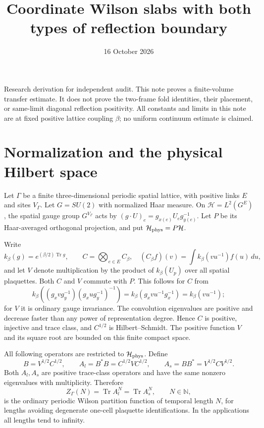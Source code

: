 \documentclass[11pt]{article}
\newcommand{\tr}{\operatorname{Tr}}
\begin{document}
\title{Coordinate Wilson slabs with both types of reflection boundary}
\date{16 October 2026}\maketitle
\noindent Research derivation for independent audit. This note proves a
finite-volume transfer estimate. It does not prove the two-frame fold
identities, their placement, or same-limit diagonal reflection positivity.
All constants and limits in this note are at fixed positive lattice
coupling $\beta$; no uniform continuum estimate is claimed.

\section{Normalization and the physical Hilbert space}

Let $\Gamma$ be a finite three-dimensional periodic spatial lattice, with
positive links $E$ and sites $V_\Gamma$. Let $G=SU(2)$ with normalized
Haar measure. On $\mathcal H=L^2(G^E)$, the spatial gauge group
$G^{V_\Gamma}$ acts by
$(g\cdot U)_e=g_{x(e)}U_eg_{y(e)}^{-1}$.
Let $P$ be its Haar-averaged orthogonal projection, and put
$\mathcal H_{\rm phys}=P\mathcal H$.

Write
\[
 k_\beta(g)=e^{(\beta/2)\tr g},\qquad
 C=\bigotimes_{e\in E}C_\beta,
 \quad(C_\beta f)(v)=\int k_\beta(vu^{-1})f(u)\,du,
\]
and let $V$ denote multiplication by the product of $k_\beta(U_p)$ over
all spatial plaquettes. Both $C$ and $V$ commute with $P$. This follows
for $C$ from
\[
 k_\beta((g_xvg_y^{-1})(g_xug_y^{-1})^{-1})
 =k_\beta(g_xvu^{-1}g_x^{-1})=k_\beta(vu^{-1});
\]
for $V$ it is ordinary gauge invariance.
The convolution eigenvalues are positive and decrease faster than any
power of representation degree. Hence $C$ is positive, injective and
trace class, and $C^{1/2}$ is Hilbert--Schmidt. The positive function
$V$ and its square root are bounded on this finite compact space.

All following operators are restricted to $\mathcal H_{\rm phys}$.
Define
\[
 B=V^{1/2}C^{1/2},\qquad
 A_l=B^*B=C^{1/2}VC^{1/2},\qquad
 A_s=BB^*=V^{1/2}CV^{1/2}.
\]
Both $A_l,A_s$ are positive trace-class operators and have the same
nonzero eigenvalues with multiplicity. Therefore
\[
 Z_\Gamma(N)=\tr A_l^N=\tr A_s^N,\qquad N\in\mathbb N,
 \tag{1}
\]
is the ordinary periodic Wilson partition function of temporal length
$N$, for lengths avoiding degenerate one-cell plaquette identifications.
In the applications all lengths tend to infinity.
\end{document}
